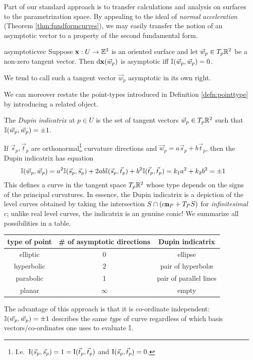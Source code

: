 \goodbreak



Part of our standard approach is to transfer calculations and analysis on surfaces to the parametrization space. By appealing to the ideal of \emph{normal acceleration} (Theorem \ref{thm:fundformcurves}), we may easily transfer the notion of an asymptotic vector to a property of the second fundamental form.

\begin{thm}{}{asymptoticvec}
	Suppose ${\mathbf{x}}:U\to\mathbb{E}^3$ is an oriented surface and let $\vec w_p\in T_p\mathbb{R}^2$ be a non-zero tangent vector. Then $\mathrm{d}{\mathbf{x}}(\vec w_p)$ is asymptotic iff $\mathbb{I}(\vec w_p,\vec w_p)=0$.
\end{thm}

We tend to call such a tangent vector $\vec w_p$ asymptotic in its own right.\smallbreak

We can moreover restate the point-types introduced in Definition \ref{defn:pointtype} by introducing a related object.

\begin{defn}{}{}
	The \emph{Dupin indicatrix} at $p\in U$ is the set of tangent vectors $\vec w_p\in T_p\mathbb{R}^2$ such that $\mathbb{I}(\vec w_p,\vec w_p)=\pm 1$.
\end{defn}

If $\vec s_p,\vec t_p$ are orthonormal\footnote{I.e.\ $\mathrm{I}(\vec s_p,\vec s_p)=1=\mathrm{I}(\vec t_p,\vec t_p)$ and $\mathrm{I}(\vec s_p,\vec t_p)=0$.} curvature directions and $\vec w_p=a\vec s_p+b\vec t_p$, then the Dupin indicatrix has equation
\begin{align*}
	\mathbb{I}(\vec w_p,\vec w_p)&=a^2\mathbb{I}(\vec s_p,\vec s_p) +2ab\mathbb{I}(\vec s_p,\vec t_p) + b^2\mathbb{I}(\vec t_p,\vec t_p) =k_1a^2+k_2b^2=\pm 1
\end{align*}
This defines a curve in the tangent space $T_p\mathbb{R}^2$ whose type depends on the signs of the principal curvatures. In essence, the Dupin indicatrix is a depiction of the level curves obtained by taking the intersection $S\cap (c{\mathbf{n}}_P+T_PS)$ for \emph{infinitesimal} $c$; unlike real level curves, the indicatrix is an genuine conic! We summarize all possibilities in a table.
\begin{center}
	\begin{tabular}{c|c|c}
		type of point&\# of asymptotic directions&Dupin indicatrix\\\hline
		elliptic&0&ellipse\\
		hyperbolic&2&pair of hyperbolæ\\
		parabolic&1&pair of parallel lines\\
		planar&$\infty$&empty
	\end{tabular}
\end{center}
The advantage of this approach is that it is co-ordinate independent: $\mathbb{I}(\vec w_p,\vec w_p)=\pm 1$ describes the same \emph{type} of curve regardless of which basis vectors/co-ordinates one uses to evaluate $\mathbb{I}$.


